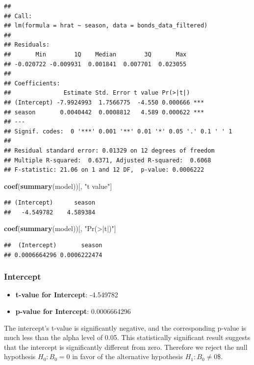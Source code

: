 \documentclass[
]{article}
\newenvironment{Shaded}{\begin{snugshade}}{\end{snugshade}}
\newcommand{\FunctionTok}[1]{\textcolor[rgb]{0.13,0.29,0.53}{\textbf{#1}}}
\newcommand{\NormalTok}[1]{#1}
\newcommand{\StringTok}[1]{\textcolor[rgb]{0.31,0.60,0.02}{#1}}
\providecommand{\tightlist}{%
  \setlength{\itemsep}{0pt}\setlength{\parskip}{0pt}}
\begin{document}
\begin{verbatim}
## 
## Call:
## lm(formula = hrat ~ season, data = bonds_data_filtered)
## 
## Residuals:
##       Min        1Q    Median        3Q       Max 
## -0.020722 -0.009931  0.001841  0.007701  0.023055 
## 
## Coefficients:
##               Estimate Std. Error t value Pr(>|t|)    
## (Intercept) -7.9924993  1.7566775  -4.550 0.000666 ***
## season       0.0040442  0.0008812   4.589 0.000622 ***
## ---
## Signif. codes:  0 '***' 0.001 '**' 0.01 '*' 0.05 '.' 0.1 ' ' 1
## 
## Residual standard error: 0.01329 on 12 degrees of freedom
## Multiple R-squared:  0.6371, Adjusted R-squared:  0.6068 
## F-statistic: 21.06 on 1 and 12 DF,  p-value: 0.0006222
\end{verbatim}

\begin{Shaded}
\begin{Highlighting}[]
\FunctionTok{coef}\NormalTok{(}\FunctionTok{summary}\NormalTok{(model))[, }\StringTok{"t value"}\NormalTok{]}
\end{Highlighting}
\end{Shaded}

\begin{verbatim}
## (Intercept)      season 
##   -4.549782    4.589384
\end{verbatim}

\begin{Shaded}
\begin{Highlighting}[]
\FunctionTok{coef}\NormalTok{(}\FunctionTok{summary}\NormalTok{(model))[, }\StringTok{"Pr(\textgreater{}|t|)"}\NormalTok{]}
\end{Highlighting}
\end{Shaded}

\begin{verbatim}
##  (Intercept)       season 
## 0.0006664296 0.0006222474
\end{verbatim}

\subsubsection{Intercept}\label{intercept}

\begin{itemize}
\tightlist
\item
  \textbf{t-value for Intercept}: -4.549782
\item
  \textbf{p-value for Intercept}: 0.0006664296
\end{itemize}

The intercept's t-value is significantly negative, and the corresponding
p-value is much less than the alpha level of 0.05. This statistically
significant result suggests that the intercept is significantly
different from zero. Therefore we reject the null hypothesis
\(H_0: B_{0} = 0\) in favor of the alternative hypothesis
\(H_1: B_{0} \neq 0\)\$.
\end{document}
